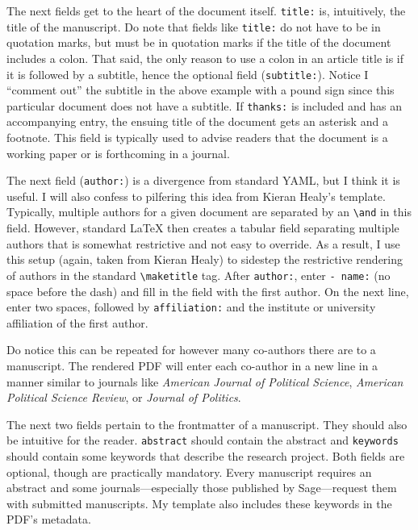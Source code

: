 \documentclass[10pt,a4paper]{article}
\begin{document}
The next fields get to the heart of the document itself. \texttt{title:}
is, intuitively, the title of the manuscript. Do note that fields like
\texttt{title:} do not have to be in quotation marks, but must be in
quotation marks if the title of the document includes a colon. That
said, the only reason to use a colon in an article title is if it is
followed by a subtitle, hence the optional field (\texttt{subtitle:}).
Notice I ``comment out'' the subtitle in the above example with a pound
sign since this particular document does not have a subtitle. If
\texttt{thanks:} is included and has an accompanying entry, the ensuing
title of the document gets an asterisk and a footnote. This field is
typically used to advise readers that the document is a working paper or
is forthcoming in a journal.

The next field (\texttt{author:}) is a divergence from standard YAML,
but I think it is useful. I will also confess to pilfering this idea
from Kieran Healy's template. Typically, multiple authors for a given
document are separated by an \texttt{\textbackslash{}and} in this field.
However, standard LaTeX then creates a tabular field separating multiple
authors that is somewhat restrictive and not easy to override. As a
result, I use this setup (again, taken from Kieran Healy) to sidestep
the restrictive rendering of authors in the standard
\texttt{\textbackslash{}maketitle} tag. After \texttt{author:}, enter
\texttt{-\ name:} (no space before the dash) and fill in the field with
the first author. On the next line, enter two spaces, followed by
\texttt{affiliation:} and the institute or university affiliation of the
first author.

Do notice this can be repeated for however many co-authors there are to
a manuscript. The rendered PDF will enter each co-author in a new line
in a manner similar to journals like \emph{American Journal of Political
Science}, \emph{American Political Science Review}, or \emph{Journal of
Politics}.

The next two fields pertain to the frontmatter of a manuscript. They
should also be intuitive for the reader. \texttt{abstract} should
contain the abstract and \texttt{keywords} should contain some keywords
that describe the research project. Both fields are optional, though are
practically mandatory. Every manuscript requires an abstract and some
journals---especially those published by Sage---request them with
submitted manuscripts. My template also includes these keywords in the
PDF's metadata.
\end{document}
